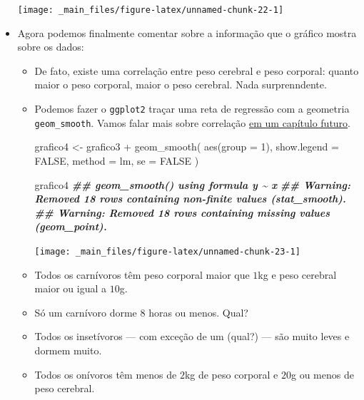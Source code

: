 \documentclass[
  11pt]{report}
\newenvironment{Shaded}{\begin{snugshade}}{\end{snugshade}}
\newcommand{\AttributeTok}[1]{\textcolor[rgb]{0.77,0.63,0.00}{#1}}
\newcommand{\ConstantTok}[1]{\textcolor[rgb]{0.00,0.00,0.00}{#1}}
\newcommand{\DecValTok}[1]{\textcolor[rgb]{0.00,0.00,0.81}{#1}}
\newcommand{\DocumentationTok}[1]{\textcolor[rgb]{0.56,0.35,0.01}{\textbf{\textit{#1}}}}
\newcommand{\FunctionTok}[1]{\textcolor[rgb]{0.00,0.00,0.00}{#1}}
\newcommand{\NormalTok}[1]{#1}
\newcommand{\OtherTok}[1]{\textcolor[rgb]{0.56,0.35,0.01}{#1}}
\newcommand{\SpecialCharTok}[1]{\textcolor[rgb]{0.00,0.00,0.00}{#1}}
\newcommand{\StringTok}[1]{\textcolor[rgb]{0.31,0.60,0.02}{#1}}
\renewenvironment{Shaded}{
  \begin{mdframed}[%
    roundcorner=2pt,%
    innerleftmargin=5pt,%
    innerrightmargin=5pt,%
    topline=true,%
    leftline=true,%
    rightline=true,%
    bottomline=true,%
    linewidth=0.5pt,%
    linecolor=black!20,%
    backgroundcolor=black!2,%
    skipabove=2ex,%
    skipbelow=2.5ex%
  ]%
}
{
  \end{mdframed}
}
\begin{document}
\begin{itemize}
  \begin{center}\texttt{[image: \_main\_files/figure-latex/unnamed-chunk-22-1]} \end{center}
\item
  Agora podemos finalmente comentar sobre a informação que o gráfico mostra sobre os dados:

  \begin{itemize}
  \item
    De fato, existe uma correlação entre peso cerebral e peso corporal: quanto maior o peso corporal, maior o peso cerebral. Nada surprenndente.
  \item
    \protect\hypertarget{grafico4}{}{} Podemos fazer o \texttt{ggplot2} traçar uma reta de regressão com a geometria \texttt{geom\_smooth}. Vamos falar mais sobre correlação \protect\hyperlink{correlacao}{em um capítulo futuro}.

\begin{Shaded}
\begin{Highlighting}[]
\NormalTok{grafico4 }\OtherTok{\textless{}{-}}\NormalTok{ grafico3 }\SpecialCharTok{+}
  \FunctionTok{geom\_smooth}\NormalTok{(}
    \FunctionTok{aes}\NormalTok{(}\AttributeTok{group =} \DecValTok{1}\NormalTok{), }
    \AttributeTok{show.legend =} \ConstantTok{FALSE}\NormalTok{,}
    \AttributeTok{method =} \StringTok{\textquotesingle{}lm\textquotesingle{}}\NormalTok{, }
    \AttributeTok{se =} \ConstantTok{FALSE}
\NormalTok{  )}

\NormalTok{grafico4}
\DocumentationTok{\#\# \textasciigrave{}geom\_smooth()\textasciigrave{} using formula \textquotesingle{}y \textasciitilde{} x\textquotesingle{}}
\DocumentationTok{\#\# Warning: Removed 18 rows containing non{-}finite values (stat\_smooth).}
\DocumentationTok{\#\# Warning: Removed 18 rows containing missing values (geom\_point).}
\end{Highlighting}
\end{Shaded}

    \begin{center}\texttt{[image: \_main\_files/figure-latex/unnamed-chunk-23-1]} \end{center}
  \item
    Todos os carnívoros têm peso corporal maior que $1$kg e peso cerebral maior ou igual a $10$g.
  \item
    Só um carnívoro dorme $8$ horas ou menos. Qual?
  \item
    Todos os insetívoros --- com exceção de um (qual?) --- são muito leves e dormem muito.
  \item
    Todos os onívoros têm menos de $2$kg de peso corporal e $20$g ou menos de peso cerebral.
  \end{itemize}
\end{itemize}
\end{document}
